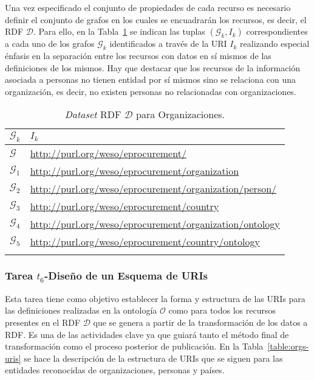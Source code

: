 Una vez especificado el conjunto de propiedades de cada recurso es necesario definir el conjunto 
de grafos en los cuales se encuadrarán los recursos, es decir, el \dataset \gls{RDF} $\mathcal{D}$. Para ello, 
en la Tabla~\ref{table:orgs-dataset} se indican las tuplas $(\mathcal{G}_k, I_k)$ correspondientes a cada uno 
de los grafos $\mathcal{G}_k$ identificados a través de la \gls{URI} $I_k$ realizando especial énfasis en la separación 
entre los recursos con datos en sí mismos de las definiciones de los mismos. Hay que destacar que los recursos 
de la información asociada a personas no tienen entidad por sí mismos sino se relaciona con una organización, es decir, 
no existen personas no relacionadas con organizaciones.

\begin{longtable}[c]{|p{3cm}|p{9cm}|} 
\hline
  \textbf{$\mathcal{G}_k$} &  \textbf{$I_k$}  \\\hline
\endhead
 \textbf{$\mathcal{G}$}     & \url{http://purl.org/weso/eprocurement/} \\ \hline
 \textbf{$\mathcal{G}_{1}$} & \url{http://purl.org/weso/eprocurement/organization} \\ \hline
 \textbf{$\mathcal{G}_{2}$} & \url{http://purl.org/weso/eprocurement/organization/person/} \\ \hline
 \textbf{$\mathcal{G}_{3}$} & \url{http://purl.org/weso/eprocurement/country} \\ \hline
 \textbf{$\mathcal{G}_{4}$} & \url{http://purl.org/weso/eprocurement/organization/ontology} \\ \hline
 \textbf{$\mathcal{G}_{5}$} & \url{http://purl.org/weso/eprocurement/country/ontology} \\ \hline 
\hline
\caption{\textit{Dataset} RDF $\mathcal{D}$ para Organizaciones.}\label{table:orgs-dataset}\\    
\end{longtable}


\subsubsection{Tarea $t_6$-Diseño de un Esquema de URIs}
Esta tarea tiene como objetivo establecer la forma y estructura de las \gls{URI}s para las definiciones 
realizadas en la ontología $\mathcal{O}$ como para todos los recursos presentes en el \dataset RDF $\mathcal{D}$ que 
se genera a partir de la transformación de los datos a \gls{RDF}. Es una de las actividades clave ya que guiará 
tanto el método final de transformación como el proceso posterior de publicación. En la Tabla~\ref{table:orgs-uris} se 
hace la descripción de la estructura de URIs que se siguen para las entidades reconocidas de organizaciones, personas y países.

